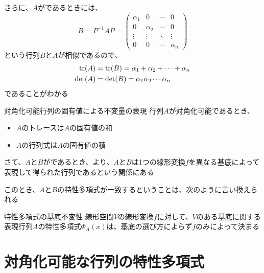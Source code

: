 \documentclass[../../../topic_linear-algebra]{subfiles}
\begin{document}
\br

さらに、$A$がであるときには、
\begin{equation*}
  B = P^{-1}AP = \begin{pmatrix}
    \alpha_1 & 0        & \cdots & 0        \\
    0        & \alpha_2 & \cdots & 0        \\
    \vdots   & \vdots   & \ddots & \vdots   \\
    0        & 0        & \cdots & \alpha_n
  \end{pmatrix}
\end{equation*}
という行列$B$と$A$が相似であるので、
\begin{align*}
  \tr(A)  & = \tr(B) = \alpha_1 + \alpha_2 + \cdots + \alpha_n \\
  \det(A) & = \det(B) = \alpha_1 \alpha_2 \cdots \alpha_n
\end{align*}
であることがわかる

\begin{theorem*}{対角化可能行列の固有値による不変量の表現}
  行列$A$が対角化可能であるとき、
  \begin{itemize}
    \item $A$のトレースは$A$の固有値の和
    \item $A$の行列式は$A$の固有値の積
  \end{itemize}
\end{theorem*}

\sectionline

さて、$A$と$B$がであるとき、より、$A$と$B$は1つの線形変換$f$を異なる基底によって表現して得られた行列であるという関係にある

\br

このとき、$A$と$B$の特性多項式が一致するということは、次のように言い換えられる

\begin{theorem*}{特性多項式の基底不変性}
  線形空間$V$の線形変換$f$に対して、$V$のある基底に関する表現行列$A$の特性多項式$\Phi_A(x)$は、基底の選び方によらず$f$のみによって決まる
\end{theorem*}

\sectionline
\section{対角化可能な行列の特性多項式}
\end{document}
